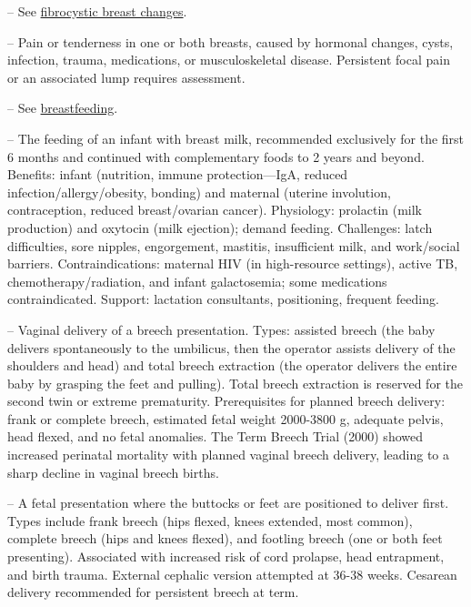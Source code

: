 -- See \hyperlink{Fibrocystic Breast Changes}{fibrocystic breast changes}.

-- Pain or tenderness in one or both breasts, caused by hormonal changes, cysts, infection, trauma, medications, or musculoskeletal disease. Persistent focal pain or an associated lump requires assessment.

-- See \hyperlink{Breastfeeding}{breastfeeding}.

-- The feeding of an infant with breast milk, recommended exclusively for the first 6 months and continued with complementary foods to 2 years and beyond. Benefits: infant (nutrition, immune protection—IgA, reduced infection/allergy/obesity, bonding) and maternal (uterine involution, contraception, reduced breast/ovarian cancer). Physiology: prolactin (milk production) and oxytocin (milk ejection); demand feeding. Challenges: latch difficulties, sore nipples, engorgement, mastitis, insufficient milk, and work/social barriers. Contraindications: maternal HIV (in high-resource settings), active TB, chemotherapy/radiation, and infant galactosemia; some medications contraindicated. Support: lactation consultants, positioning, frequent feeding.

-- Vaginal delivery of a breech presentation. Types: assisted breech (the baby delivers spontaneously to the umbilicus, then the operator assists delivery of the shoulders and head) and total breech extraction (the operator delivers the entire baby by grasping the feet and pulling). Total breech extraction is reserved for the second twin or extreme prematurity. Prerequisites for planned breech delivery: frank or complete breech, estimated fetal weight 2000-3800 g, adequate pelvis, head flexed, and no fetal anomalies. The Term Breech Trial (2000) showed increased perinatal mortality with planned vaginal breech delivery, leading to a sharp decline in vaginal breech births.

-- A fetal presentation where the buttocks or feet are positioned to deliver first. Types include frank breech (hips flexed, knees extended, most common), complete breech (hips and knees flexed), and footling breech (one or both feet presenting). Associated with increased risk of cord prolapse, head entrapment, and birth trauma. External cephalic version attempted at 36-38 weeks. Cesarean delivery recommended for persistent breech at term.

